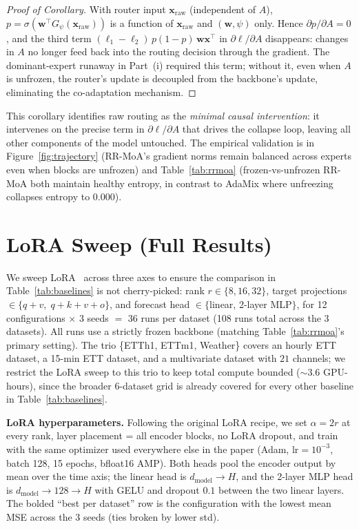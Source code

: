 \documentclass{article}
\begin{document}
\begin{proof}[Proof of Corollary]
With router input $\mathbf{x}_\mathrm{raw}$ (independent of $A$), $p = \sigma(\mathbf{w}^\top G_\psi(\mathbf{x}_\mathrm{raw}))$ is a function of $\mathbf{x}_\mathrm{raw}$ and $(\mathbf{w}, \psi)$ only. Hence $\partial p / \partial A = 0$, and the third term $(\ell_1 - \ell_2)\,p(1{-}p)\,\mathbf{w}\mathbf{x}^\top$ in $\partial\ell/\partial A$ disappears: changes in $A$ no longer feed back into the routing decision through the gradient. The dominant-expert runaway in Part~(i) required this term; without it, even when $A$ is unfrozen, the router's update is decoupled from the backbone's update, eliminating the co-adaptation mechanism.
\end{proof}

This corollary identifies raw routing as the \emph{minimal causal intervention}: it intervenes on the precise term in $\partial\ell/\partial A$ that drives the collapse loop, leaving all other components of the model untouched. The empirical validation is in Figure~\ref{fig:trajectory} (RR-MoA's gradient norms remain balanced across experts even when blocks are unfrozen) and Table~\ref{tab:rrmoa} (frozen-vs-unfrozen RR-MoA both maintain healthy entropy, in contrast to AdaMix where unfreezing collapses entropy to $0.000$).

\section{LoRA Sweep (Full Results)}
\label{app:lora_sweep}

We sweep LoRA~\citep{hu2022lora} across three axes to ensure the comparison in Table~\ref{tab:baselines} is not cherry-picked: rank $r{\in}\{8,16,32\}$, target projections ${\in}\{q{+}v,\; q{+}k{+}v{+}o\}$, and forecast head ${\in}\{$linear, 2-layer MLP$\}$, for 12 configurations $\times$ 3 seeds $=$ 36 runs per dataset (108 runs total across the 3 datasets). All runs use a strictly frozen backbone (matching Table~\ref{tab:rrmoa}'s primary setting). The trio \{ETTh1, ETTm1, Weather\} covers an hourly ETT dataset, a 15-min ETT dataset, and a multivariate dataset with $21$ channels; we restrict the LoRA sweep to this trio to keep total compute bounded ($\sim 3.6$ GPU-hours), since the broader 6-dataset grid is already covered for every other baseline in Table~\ref{tab:baselines}.

\textbf{LoRA hyperparameters.} Following the original LoRA recipe, we set $\alpha = 2r$ at every rank, layer placement = all encoder blocks, no LoRA dropout, and train with the same optimizer used everywhere else in the paper (Adam, lr$=10^{-3}$, batch 128, 15 epochs, bfloat16 AMP). Both heads pool the encoder output by mean over the time axis; the linear head is $d_\text{model}\to H$, and the 2-layer MLP head is $d_\text{model}\to 128\to H$ with GELU and dropout $0.1$ between the two linear layers. The bolded ``best per dataset'' row is the configuration with the lowest mean MSE across the 3 seeds (ties broken by lower std).
\end{document}
